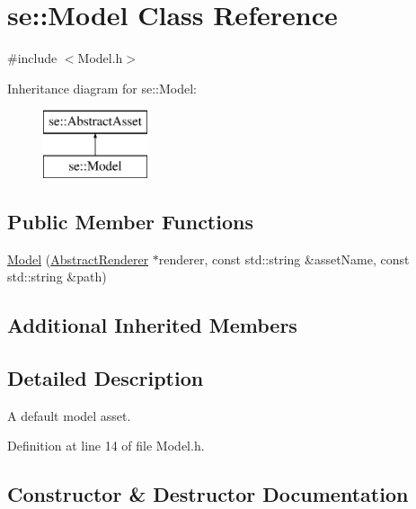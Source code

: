 \hypertarget{classse_1_1_model}{}\section{se\+:\+:Model Class Reference}
\label{classse_1_1_model}


{\ttfamily \#include $<$Model.\+h$>$}

Inheritance diagram for se\+:\+:Model\+:\begin{figure}[H]
\begin{center}
\leavevmode
\includegraphics[height=2.000000cm]{classse_1_1_model}
\end{center}
\end{figure}
\subsection*{Public Member Functions}
\begin{DoxyCompactItemize}
\item 
\mbox{\hyperlink{classse_1_1_model_ad3008603c6880370d89d1e0eee7243df}{Model}} (\mbox{\hyperlink{classse_1_1_abstract_renderer}{Abstract\+Renderer}} $\ast$renderer, const std\+::string \&asset\+Name, const std\+::string \&path)
\end{DoxyCompactItemize}
\subsection*{Additional Inherited Members}


\subsection{Detailed Description}
A default model asset. 

Definition at line 14 of file Model.\+h.



\subsection{Constructor \& Destructor Documentation}
\mbox{\label{classse_1_1_model_ad3008603c6880370d89d1e0eee7243df}} 
